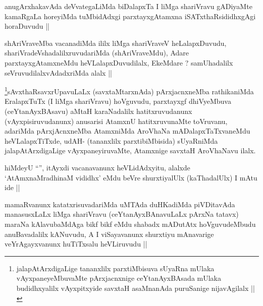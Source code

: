 \begin{artha}
anugArxhakavAda deVvategaLiMda biDalapxTa I liMga shariVravu gADiyaMte
kamaRgaLa horeyiMda tuMbidAdxgi parxtayxgAtamxna iSATxthaRsididhxgAgi
horaDuvudu ||
\end{artha}


\begin{artha}
shAriVraveMba vacanadiMda ililx liMga shariVraveV heLalapxDuvudu,
shariVradeVshadalilxruvudariMda (shAriVraveMdu), Adare
parxtayxgAtamxneMdu heVLalapxDuvudilalx, EkeMdare ? samUhadalilx
seVruvudilalxvAdadxriMda alalx ||
\end{artha}


\begin{artha}
\footnote[1]{jalapAtArxdigaLige tananxlilx parxtiMbisuva sUyaRna
  mUlaka vAyxpaneyeMbuvaMte pArxjacnxnige ceYtanAyxBAsada mUlaka
  budidhxyalilx vAyxpitxyide savxtaH asaMnanAda puruSanige
  nijavAgilalx ||}sAvxthaRsavxrUpavuLaLx (savxtaMtarxnAda) pArxjacnxneMba
rathikaniMda EralapxTuTx (I liMga shariVravu) hoVguvudu, parxtayxgf
dhiVyeMbuva (ceYtanAyxBAsavu) aMtaH karaNadalilx hatitxruvudanunx
(vAyxpisiruvudanunx) anusarisi AtamxnU hatitxruvunaMte toVruvanu,
adariMda pArxjAcnxneMba AtamxniMda AroVhaNa mADalapxTaTxvaneMdu
heVLalapxTiTxde, udAH- (tananxlilx parxtibiMbisida) sUyaRniMda
jalapAtArxdigaLige vAyxpaneyiruvaMte, Atamxnige savxtaH AroVhaNavu ilalx. 
\end{artha}


\begin{artha}
hiMdeyU ``\stext'', itAyxdi vacanavanunx heVLidAdxyitu, alalxde
`AtAmxnaMradhinaM vididhx' eMdu beVre shurxtiyalUlx (kaThadalUlx) I
mAtu ide ||
\end{artha}


\begin{artha}
mamaRvanunx katatxrisuvadariMda uMTAda duHKadiMda piVDitavAda
manasusxLaLx liMga shariVravu (ceYtanAyxBAnavuLaLx pArxNa tatavx)
maraNa kAlavubaMdAga bikf bikf eMdu shabadx mADutAtx hoVguvudeMbudu
anuBavadalilx kANuvudu, A I viSayavanunx shurxtiyu mAnavarige
veYrAgayxvanunx huTiTxsalu heVLiruvudu ||
\end{artha}

